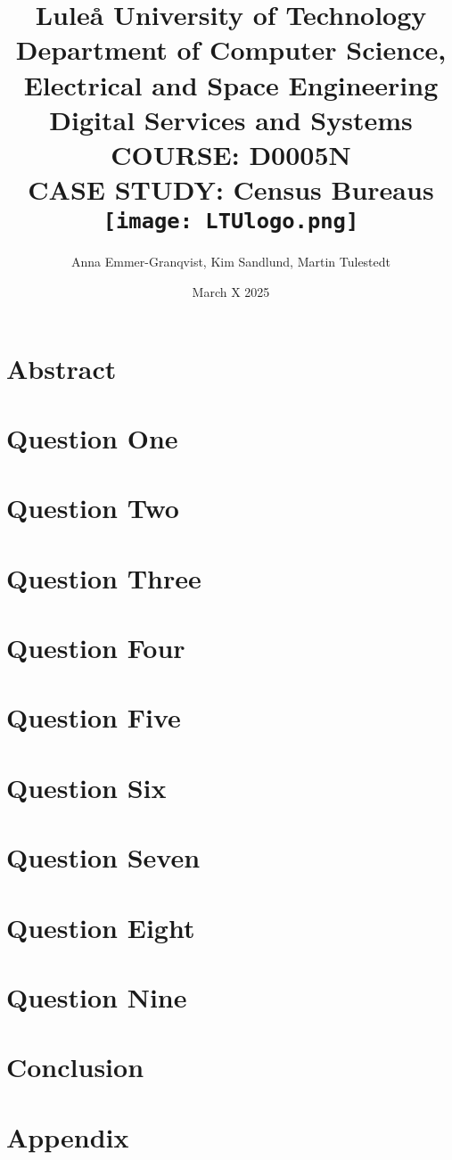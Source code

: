 \documentclass[12pt,a4paper]{report}
\title{
    {\large Luleå University of Technology}\\
    {\large Department of Computer Science, Electrical and Space Engineering}\\
    {\large Digital Services and Systems}\\
    {\large COURSE: D0005N}\\
    {CASE STUDY: Census Bureaus}\\
    {\centering\texttt{[image: LTUlogo.png]}}\\
}
\author{Anna Emmer-Granqvist, Kim Sandlund, Martin Tulestedt}
\date{March X 2025}
\begin{document}
\maketitle

\chapter*{Abstract}



\tableofcontents

\chapter{Question One}


\chapter{Question Two}


\chapter{Question Three}


\chapter{Question Four}


\chapter{Question Five}


\chapter{Question Six}


\chapter{Question Seven}


\chapter{Question Eight}


\chapter{Question Nine}


\chapter{Conclusion}


\chapter{Appendix}


\printbibliography
\end{document}
